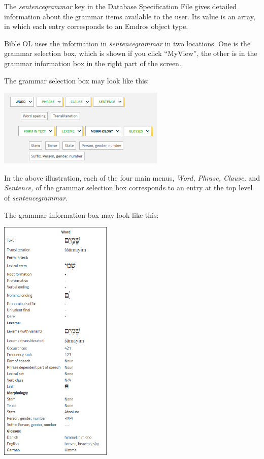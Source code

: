 \documentclass[11pt,oneside,a4paper]{memoir}
\begin{document}
The \emph{sentencegrammar} key in the Database Specification File gives detailed information about
the grammar items available to the user. Its value is an array, in which each entry
corresponds to an Emdros object type.

Bible OL uses the information in \emph{sentencegrammar} in two locations. One is the grammar
selection box, which is shown if you click ``MyView'', the other is in the
grammar information box in the right part of the screen.

The grammar selection box may look like this:

\begin{center}
  \includegraphics[width=0.6\textwidth]{grammarselect.png}\label{grammarselect}
\end{center}

In the above illustration, each of the four main menus, \emph{Word, Phrase, Clause,} and
\emph{Sentence,} of the grammar selection box corresponds to an entry at the top level of
\emph{sentencegrammar}.

The grammar information box may look like this:

\begin{center}
  \includegraphics[width=0.4\textwidth]{grammarinfo.png}
\end{center}
\end{document}
